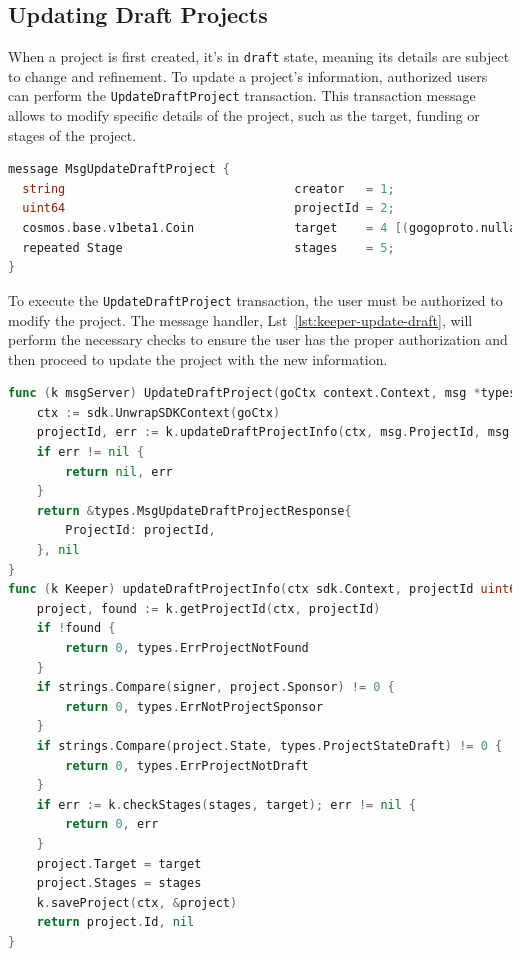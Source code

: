 \subsection{Updating Draft Projects}

When a project is first created, it's in \texttt{draft} state, meaning its details are subject to change and refinement. To update a project's information, authorized users can perform the \texttt{UpdateDraftProject} transaction. This transaction message allows to modify specific details of the project, such as the target, funding or stages of the project.

\begin{lstlisting}[language=go, caption=UpdateDraftProject protobuf definition,label={lst:update_draft_project_proto}]
message MsgUpdateDraftProject {
  string                                creator   = 1;
  uint64                                projectId = 2;
  cosmos.base.v1beta1.Coin              target    = 4 [(gogoproto.nullable) = false];
  repeated Stage                        stages    = 5;
}
\end{lstlisting}

To execute the \texttt{UpdateDraftProject} transaction, the user must be authorized to modify the project. The message handler, Lst~\ref{lst:keeper-update-draft}, will perform the necessary checks to ensure the user has the proper authorization and then proceed to update the project with the new information.

\newpage
\begin{lstlisting}[language=go, caption=Keeper implementation for UpdateDraftProject ,label={lst:keeper-update-draft}]
func (k msgServer) UpdateDraftProject(goCtx context.Context, msg *types.MsgUpdateDraftProject) (*types.MsgUpdateDraftProjectResponse, error) {
	ctx := sdk.UnwrapSDKContext(goCtx)
	projectId, err := k.updateDraftProjectInfo(ctx, msg.ProjectId, msg.Target, msg.Stages, msg.Creator)
	if err != nil {
		return nil, err
	}
	return &types.MsgUpdateDraftProjectResponse{
		ProjectId: projectId,
	}, nil
}
func (k Keeper) updateDraftProjectInfo(ctx sdk.Context, projectId uint64, target sdk.Coin, stages []*types.Stage, signer string) (uint64, error) {
	project, found := k.getProjectId(ctx, projectId)
	if !found {
		return 0, types.ErrProjectNotFound
	}
	if strings.Compare(signer, project.Sponsor) != 0 {
		return 0, types.ErrNotProjectSponsor
	}
	if strings.Compare(project.State, types.ProjectStateDraft) != 0 {
		return 0, types.ErrProjectNotDraft
	}
	if err := k.checkStages(stages, target); err != nil {
		return 0, err
	}
	project.Target = target
	project.Stages = stages
	k.saveProject(ctx, &project)
	return project.Id, nil
}
\end{lstlisting}

